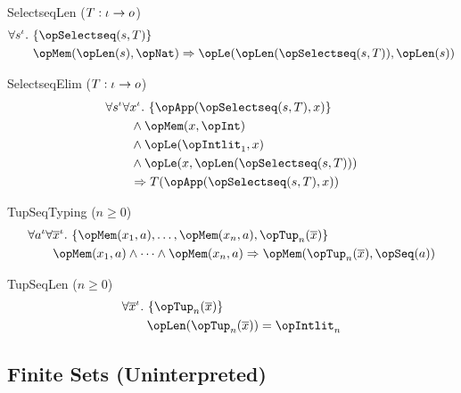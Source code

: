 \documentclass[11pt, a4paper, oneside]{article}
\begin{document}
\begin{axioms}
\item[SelectseqLen ($T : \iota \rightarrow o$)] \[
        \begin{aligned}
            &\forall s^\idv.\, \st{ \opSelectseq(s, T) } \\
            &\qquad \opMem(\opLen(s), \opNat) \imp \opLe(\opLen(\opSelectseq(s, T)), \opLen(s))
        \end{aligned}
    \]

\item[SelectseqElim ($T : \iota \rightarrow o$)] \[
        \begin{aligned}
            &\forall s^\idv \forall x^\idv.\, \st{ \opApp(\opSelectseq(s, T), x) } \\
            &\qquad \wedge \opMem(x, \opInt) \\
            &\qquad \wedge \opLe(\opIntlit_1, x) \\
            &\qquad \wedge \opLe(x, \opLen(\opSelectseq(s, T))) \\
            &\qquad \imp T(\opApp(\opSelectseq(s, T), x))
        \end{aligned}
    \]

\item[TupSeqTyping ($n \ge 0$)] \[
        \begin{aligned}
            &\forall a^\idv \forall \overline{x}^\idv.\, \st{ \opMem(x_1, a), \dots, \opMem(x_n, a), \opTup_n(\overline{x}) } \\
            &\qquad \opMem(x_1, a) \wedge \dots \wedge \opMem(x_n, a) \imp \opMem(\opTup_n(\overline{x}), \opSeq(a))
        \end{aligned}
    \]

\item[TupSeqLen ($n \ge 0$)] \[
        \begin{aligned}
            &\forall \overline{x}^\idv.\, \st{ \opTup_n(\overline{x}) } \\
            &\qquad \opLen(\opTup_n(\overline{x})) = \opIntlit_n
        \end{aligned}
    \]

\end{axioms}


    \subsection{Finite Sets (Uninterpreted)}
    \label{subsec:fsets_uninterpreted}
\end{document}

